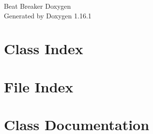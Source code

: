 \documentclass[twoside]{book}
\newcommand{\+}{\discretionary{\mbox{\scriptsize$\hookleftarrow$}}{}{}}
\newcommand{\clearemptydoublepage}{%
    \newpage{\pagestyle{empty}\cleardoublepage}%
  }
\begin{document}
  \raggedbottom
    \hypersetup{pageanchor=false,
                bookmarksnumbered=true,
                pdfencoding=unicode
               }
  \begin{titlepage}
  \vspace*{7cm}
  \begin{center}%
  {\Large Beat Breaker Doxygen}\\
  \vspace*{1cm}
  {\large Generated by Doxygen 1.16.1}\\
  \end{center}
  \end{titlepage}
  \clearemptydoublepage
  \tableofcontents
  \clearemptydoublepage
  \hypersetup{pageanchor=true}
\chapter{Class Index}

\chapter{File Index}

\chapter{Class Documentation}










































\end{document}
